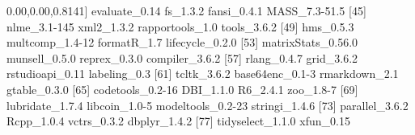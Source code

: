 \documentclass[
]{book}
\newenvironment{Shaded}{\begin{snugshade}}{\end{snugshade}}
\newcommand{\DecValTok}[1]{\textcolor[rgb]{0.00,0.00,0.81}{#1}}
\newcommand{\FloatTok}[1]{\textcolor[rgb]{0.00,0.00,0.81}{#1}}
\newcommand{\NormalTok}[1]{#1}
\begin{document}
\begin{Shaded}
\begin{Highlighting}[]
\NormalTok{[}\DecValTok{41}\NormalTok{] evaluate_}\FloatTok{0.14}\NormalTok{      fs_}\DecValTok{1}\NormalTok{.}\FloatTok{3.2}\NormalTok{           fansi_}\DecValTok{0}\NormalTok{.}\FloatTok{4.1}\NormalTok{        MASS_}\FloatTok{7.3-51.5}     
\NormalTok{[}\DecValTok{45}\NormalTok{] nlme_}\FloatTok{3.1}\DecValTok{-145}\NormalTok{       xml2_}\DecValTok{1}\NormalTok{.}\FloatTok{3.2}\NormalTok{         rapportools_}\FloatTok{1.0}\NormalTok{    tools_}\DecValTok{3}\NormalTok{.}\FloatTok{6.2}       
\NormalTok{[}\DecValTok{49}\NormalTok{] hms_}\DecValTok{0}\NormalTok{.}\FloatTok{5.3}\NormalTok{          multcomp_}\FloatTok{1.4}\DecValTok{-12}\NormalTok{    formatR_}\FloatTok{1.7}\NormalTok{        lifecycle_}\DecValTok{0}\NormalTok{.}\FloatTok{2.0}   
\NormalTok{[}\DecValTok{53}\NormalTok{] matrixStats_}\DecValTok{0}\NormalTok{.}\FloatTok{56.0}\NormalTok{ munsell_}\DecValTok{0}\NormalTok{.}\FloatTok{5.0}\NormalTok{      reprex_}\DecValTok{0}\NormalTok{.}\FloatTok{3.0}\NormalTok{       compiler_}\DecValTok{3}\NormalTok{.}\FloatTok{6.2}    
\NormalTok{[}\DecValTok{57}\NormalTok{] rlang_}\DecValTok{0}\NormalTok{.}\FloatTok{4.7}\NormalTok{        grid_}\DecValTok{3}\NormalTok{.}\FloatTok{6.2}\NormalTok{         rstudioapi_}\FloatTok{0.11}\NormalTok{    labeling_}\FloatTok{0.3}      
\NormalTok{[}\DecValTok{61}\NormalTok{] tcltk_}\DecValTok{3}\NormalTok{.}\FloatTok{6.2}\NormalTok{        base64enc_}\FloatTok{0.1}\DecValTok{-3}\NormalTok{    rmarkdown_}\FloatTok{2.1}\NormalTok{      gtable_}\DecValTok{0}\NormalTok{.}\FloatTok{3.0}      
\NormalTok{[}\DecValTok{65}\NormalTok{] codetools_}\FloatTok{0.2}\DecValTok{-16}\NormalTok{   DBI_}\DecValTok{1}\NormalTok{.}\FloatTok{1.0}\NormalTok{          R6_}\DecValTok{2}\NormalTok{.}\FloatTok{4.1}\NormalTok{           zoo_}\FloatTok{1.8}\DecValTok{-7}         
\NormalTok{[}\DecValTok{69}\NormalTok{] lubridate_}\DecValTok{1}\NormalTok{.}\FloatTok{7.4}\NormalTok{    libcoin_}\FloatTok{1.0}\DecValTok{-5}\NormalTok{      modeltools_}\FloatTok{0.2}\DecValTok{-23}\NormalTok{  stringi_}\DecValTok{1}\NormalTok{.}\FloatTok{4.6}     
\NormalTok{[}\DecValTok{73}\NormalTok{] parallel_}\DecValTok{3}\NormalTok{.}\FloatTok{6.2}\NormalTok{     Rcpp_}\DecValTok{1}\NormalTok{.}\FloatTok{0.4}\NormalTok{         vctrs_}\DecValTok{0}\NormalTok{.}\FloatTok{3.2}\NormalTok{        dbplyr_}\DecValTok{1}\NormalTok{.}\FloatTok{4.2}      
\NormalTok{[}\DecValTok{77}\NormalTok{] tidyselect_}\DecValTok{1}\NormalTok{.}\FloatTok{1.0}\NormalTok{   xfun_}\FloatTok{0.15}         
\end{Highlighting}
\end{Shaded}
\end{document}
